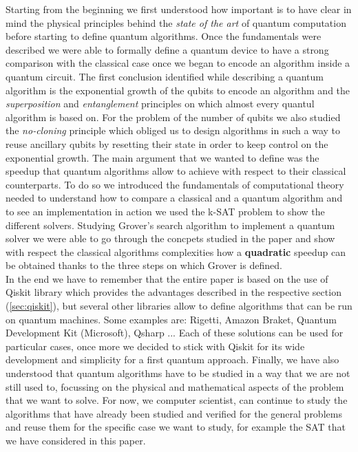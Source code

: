 \documentclass[english]{article}
\begin{document}
		Starting from the beginning we first understood how important is to have clear in mind the physical principles behind the \emph{state of the art} of quantum computation before starting to define quantum algorithms. Once the fundamentals were described we were able to formally define a quantum device to have a strong comparison with the classical case once we began to encode an algorithm inside a quantum circuit. The first conclusion identified while describing a quantum algorithm is the exponential growth of the qubits to encode an algorithm and the \emph{superposition} and \emph{entanglement} principles on which almost every quantul algorithm is based on. For the problem of the number of qubits we also studied the \emph{no-cloning} principle which obliged us to design algorithms in such a way to reuse ancillary qubits by resetting their state in order to keep control on the exponential growth. The main argument that we wanted to define was the speedup that quantum algorithms allow to achieve with respect to their classical counterparts. To do so we introduced the fundamentals of computational theory needed to understand how to compare a classical and a quantum algorithm and to see an implementation in action we used the k-SAT problem to show the different solvers. Studying Grover's search algorithm to implement a quantum solver we were able to go through the concpets studied in the paper and show with respect the classical algorithms complexities how a \textbf{quadratic} speedup can be obtained thanks to the three steps on which Grover is defined. \\
		
		In the end we have to remember that the entire paper is based on the use of Qiskit library which provides the advantages described in the respective section (\ref{sec:qiskit}), but several other libraries allow to define algorithms that can be run on quantum machines. Some examples are: Rigetti, Amazon Braket, Quantum Development Kit (Microsoft), Qsharp ... Each of these solutions can be used for particular cases, once more we decided to stick with Qiskit for its wide development and simplicity for a first quantum approach. Finally, we have also understood that quantum algorithms have to be studied in a way that we are not still used to, focussing on the physical and mathematical aspects of the problem that we want to solve. For now, we computer scientist, can continue to study the algorithms that have already been studied and verified for the general problems and reuse them for the specific case we want to study, for example the SAT that we have considered in this paper. 
		
\end{document}
